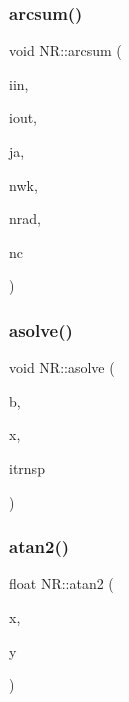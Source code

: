 \mbox{\label{namespaceNR_adea26b3b53b427d36dacd90db22fc5e2}} 
\subsubsection{\texorpdfstring{arcsum()}{arcsum()}}
{\footnotesize\ttfamily void N\+R\+::arcsum (\begin{DoxyParamCaption}\item[{\mbox{\hyperlink{namespaceNR_a117570729decc729db86f7655e7a23e5}{Vec\+\_\+\+I\+\_\+\+U\+L\+NG}} \&}]{iin,  }\item[{\mbox{\hyperlink{namespaceNR_a111b6302e9ace403b90a1d801f0c70a2}{Vec\+\_\+\+O\+\_\+\+U\+L\+NG}} \&}]{iout,  }\item[{unsigned long}]{ja,  }\item[{const int}]{nwk,  }\item[{const unsigned long}]{nrad,  }\item[{const unsigned long}]{nc }\end{DoxyParamCaption})}

\mbox{\label{namespaceNR_a73116d8e72803b4f516bbb3cd7dcd4a0}} 
\subsubsection{\texorpdfstring{asolve()}{asolve()}}
{\footnotesize\ttfamily void N\+R\+::asolve (\begin{DoxyParamCaption}\item[{\mbox{\hyperlink{namespaceNR_a9f943da53862537c552e2a770cb170ae}{Vec\+\_\+\+I\+\_\+\+DP}} \&}]{b,  }\item[{\mbox{\hyperlink{namespaceNR_a970094d23441f8ef6a45282a7eb2103d}{Vec\+\_\+\+O\+\_\+\+DP}} \&}]{x,  }\item[{const int}]{itrnsp }\end{DoxyParamCaption})}

\mbox{\label{namespaceNR_afbe2717cf898de31cf6e00b84bfc3e8f}} 
\subsubsection{\texorpdfstring{atan2()}{atan2()}\hspace{0.1cm}{\footnotesize\ttfamily [1/2]}}
{\footnotesize\ttfamily float N\+R\+::atan2 (\begin{DoxyParamCaption}\item[{float}]{x,  }\item[{double}]{y }\end{DoxyParamCaption})\hspace{0.3cm}{\ttfamily [inline]}}

